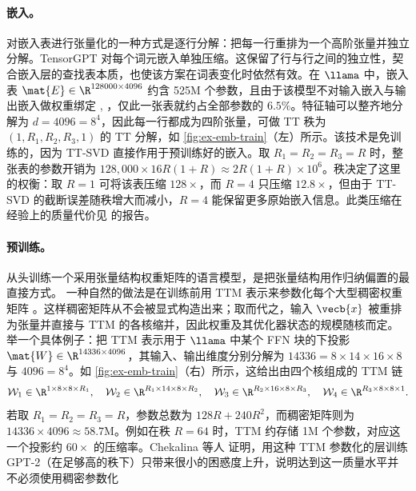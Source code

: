 
\paragraph{嵌入。} 对嵌入表进行张量化的一种方式是逐行分解：把每一行重排为一个高阶张量并独立分解。TensorGPT \cite{xu2023tensorgpt} 对每个词元嵌入单独压缩。这保留了行与行之间的独立性，契合嵌入层的查找表本质，也使该方案在词表变化时依然有效。在 $\llama$ 中，嵌入表 $\mat{E}\in\R^{128000\times 4096}$ 约含 525M 个参数，且由于该模型不对输入嵌入与输出嵌入做权重绑定 \cite{wolf2017weighttying1}, \cite{inan2017weighttying2}，仅此一张表就约占全部参数的 $6.5\%$。特征轴可以整齐地分解为 $d = 4096 = 8^4$，因此每一行都成为四阶张量，可做 TT 秩为 $(1, R_1, R_2, R_3, 1)$ 的 TT 分解，如 \cref{fig:ex-emb-train}（左）所示。该技术是免训练的，因为 TT-SVD \cite{oseledets2011tensor} 直接作用于预训练好的嵌入。取 $R_1 = R_2 = R_3 = R$ 时，整张表的参数开销为 $128{,}000 \times 16R(1+R) \approx 2R(1+R) \times 10^6$。秩决定了这里的权衡：取 $R=1$ 可将该表压缩 $128{\times}$，而 $R=4$ 只压缩 $12.8{\times}$，但由于 TT-SVD 的截断误差随秩增大而减小，$R=4$ 能保留更多原始嵌入信息。此类压缩在经验上的质量代价见 \cite{xu2023tensorgpt} 的报告。

\paragraph{预训练。}
从头训练一个采用张量结构权重矩阵的语言模型，是把张量结构用作归纳偏置的最直接方式。
一种自然的做法是在训练前用 TTM 表示来参数化每个大型稠密权重矩阵 \cite{chekalina2023ttm}。这样稠密矩阵从不会被显式构造出来；取而代之，输入 $\vecb{x}$ 被重排为张量并直接与 TTM 的各核缩并，因此权重及其优化器状态的规模随核而定。
举一个具体例子：把 TTM 表示用于 $\llama$ 中某个 FFN 块的下投影 $\mat{W}\in\R^{14336\times 4096}$，其输入、输出维度分别分解为 $14336 = 8\times 14\times 16\times 8$ 与 $4096 = 8^4$。如 \cref{fig:ex-emb-train}（右）所示，这给出由四个核组成的 TTM 链
\begin{equation*}
\mathcal{W}_1\in\R^{1\times 8\times 8\times R_1},\quad
\mathcal{W}_2\in\R^{R_1\times 14\times 8\times R_2},\quad
\mathcal{W}_3\in\R^{R_2\times 16\times 8\times R_3},\quad
\mathcal{W}_4\in\R^{R_3\times 8\times 8\times 1}.
\end{equation*}
若取 $R_1 = R_2 = R_3 = R$，参数总数为 $128R + 240R^2$，而稠密矩阵则为 $14336\times 4096\approx 58.7\text{M}$。例如在秩 $R=64$ 时，TTM 约存储 1M 个参数，对应这一个投影约 $60{\times}$ 的压缩率。Chekalina 等人 \cite{chekalina2023ttm} 证明，用这种 TTM 参数化的层训练 GPT-2（在足够高的秩下）只带来很小的困惑度上升，说明达到这一质量水平并不必须使用稠密参数化

